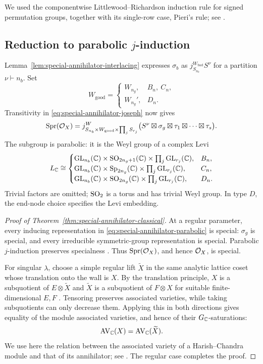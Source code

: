 We used the componentwise Littlewood--Richardson induction rule for
signed permutation groups, together with its single-row case,
Pieri's rule; see \cite[Ch.~I, \S\S5 and 9]{Macdonald1995}.

\subsection{Reduction to parabolic \texorpdfstring{$j$}{j}-induction}

Lemma~\ref{lem:special-annihilator-interlacing} expresses $\sigma_b$
as $j_{S_{n_b}}^{W_{\mathrm{bad}}}S^\nu$ for a partition
$\nu\vdash n_b$. Set
\[
  W_{\mathrm{good}}=
  \begin{cases}
    W_{n_g},&B_n,\ C_n,\\
    W_{n_g}',&D_n.
  \end{cases}
\]
Transitivity in \eqref{eq:special-annihilator-joseph} now gives
\begin{equation}\label{eq:special-annihilator-parabolic}
  \operatorname{Spr}(\mathcal{O}_X)
  =
  j_{S_{n_b}\times W_{\mathrm{good}}\times\prod_j S_{r_j}}^W
  \bigl(S^\nu\boxtimes\sigma_g
        \boxtimes\tau_1\boxtimes\cdots\boxtimes\tau_s\bigr).
\end{equation}
The subgroup is parabolic: it is the Weyl group of a complex Levi
\[
  L_{\mathbb{C}}\cong
  \begin{cases}
    \operatorname{GL}_{n_b}(\mathbb{C})\times\operatorname{SO}_{2n_g+1}(\mathbb{C})\times
       \prod_j\operatorname{GL}_{r_j}(\mathbb{C}),&B_n,\\
    \operatorname{GL}_{n_b}(\mathbb{C})\times\operatorname{Sp}_{2n_g}(\mathbb{C})\times
       \prod_j\operatorname{GL}_{r_j}(\mathbb{C}),&C_n,\\
    \operatorname{GL}_{n_b}(\mathbb{C})\times\operatorname{SO}_{2n_g}(\mathbb{C})\times
       \prod_j\operatorname{GL}_{r_j}(\mathbb{C}),&D_n.
  \end{cases}
\]
Trivial factors are omitted; $\operatorname{SO}_2$ is a torus and has trivial Weyl
group. In type $D$, the end-node choice specifies the Levi embedding.

\begin{proof}[Proof of Theorem~\ref{thm:special-annihilator-classical}]
At a regular parameter, every inducing representation in
\eqref{eq:special-annihilator-parabolic} is special: $\sigma_g$ is
special, and every irreducible symmetric-group representation is
special. Parabolic $j$-induction preserves specialness
\cite{Lusztig1979,Lusztig1984}. Thus $\operatorname{Spr}(\mathcal{O}_X)$,
and hence $\mathcal{O}_X$, is special.

For singular $\lambda$, choose a simple regular lift $\widetilde X$
in the same analytic lattice coset whose translation onto the wall is
$X$. By the translation principle, $X$ is a subquotient of
$E\otimes\widetilde X$ and $\widetilde X$ is a subquotient of
$F\otimes X$ for suitable finite-dimensional $E,F$
\cite[\S7.3]{Vogan1981}. Tensoring preserves associated varieties,
while taking subquotients can only decrease them. Applying this in
both directions gives equality of the module associated varieties,
and hence of their $G_{\mathbb{C}}$-saturations:
\[
  \operatorname{AV}_{\mathbb{C}}(X)
  =\operatorname{AV}_{\mathbb{C}}(\widetilde X).
\]
We use here the relation between the associated variety of a
Harish--Chandra module and that of its annihilator; see
\cite{Vogan1991Associated}. The regular case completes the proof.
\end{proof}


